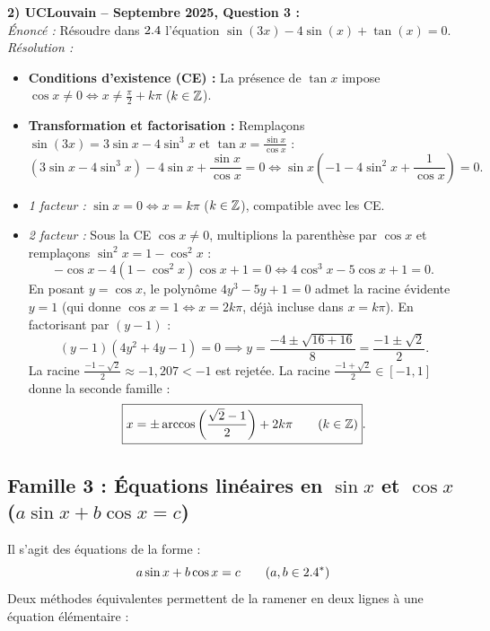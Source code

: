 \begin{exemple}
\medskip
\textbf{2) UCLouvain -- Septembre 2025, Question 3 :}\\
\emph{Énoncé :} Résoudre dans $2.4$ l'équation $\sin(3x) - 4\sin(x) + \tan(x) = 0$.\\
\emph{Résolution :}
\begin{itemize}
    \item \textbf{Conditions d'existence (CE) :} La présence de $\tan x$ impose $\cos x \neq 0 \iff x \neq \frac{\pi}{2} + k\pi$ ($k \in \mathbb{Z}$).
    \item \textbf{Transformation et factorisation :} Remplaçons $\sin(3x) = 3\sin x - 4\sin^3 x$ et $\tan x = \frac{\sin x}{\cos x}$ :
    \[
        (3\sin x - 4\sin^3 x) - 4\sin x + \frac{\sin x}{\cos x} = 0 \iff \sin x\left(-1 - 4\sin^2 x + \frac{1}{\cos x}\right) = 0.
    \]
    \item \emph{1 facteur :} $\sin x = 0 \iff \boxed{x = k\pi}$ ($k \in \mathbb{Z}$), compatible avec les CE.
    \item \emph{2 facteur :} Sous la CE $\cos x \neq 0$, multiplions la parenthèse par $\cos x$ et remplaçons $\sin^2 x = 1 - \cos^2 x$ :
    \[
        -\cos x - 4(1 - \cos^2 x)\cos x + 1 = 0 \iff 4\cos^3 x - 5\cos x + 1 = 0.
    \]
    En posant $y = \cos x$, le polynôme $4y^3 - 5y + 1 = 0$ admet la racine évidente $y = 1$ (qui donne $\cos x = 1 \iff x = 2k\pi$, déjà incluse dans $x = k\pi$). En factorisant par $(y-1)$ :
    \[
        (y - 1)(4y^2 + 4y - 1) = 0 \implies y = \frac{-4 \pm \sqrt{16 + 16}}{8} = \frac{-1 \pm \sqrt{2}}{2}.
    \]
    La racine $\frac{-1-\sqrt{2}}{2} \approx -1,207 < -1$ est rejetée. La racine $\frac{-1+\sqrt{2}}{2} \in [-1, 1]$ donne la seconde famille :
    \[
        \boxed{x = \pm\arccos\left(\frac{\sqrt{2}-1}{2}\right) + 2k\pi \qquad (k \in \mathbb{Z})}.
    \]
\end{itemize}
\end{exemple}

\subsection{Famille 3 : Équations linéaires en $\sin x$ et $\cos x$ ($a\sin x + b\cos x = c$)}

Il s'agit des équations de la forme :
\begin{equation}
    a\sin x + b\cos x = c \qquad (a, b \in 2.4^*)
\end{equation}
Deux méthodes équivalentes permettent de la ramener en deux lignes à une équation élémentaire :

